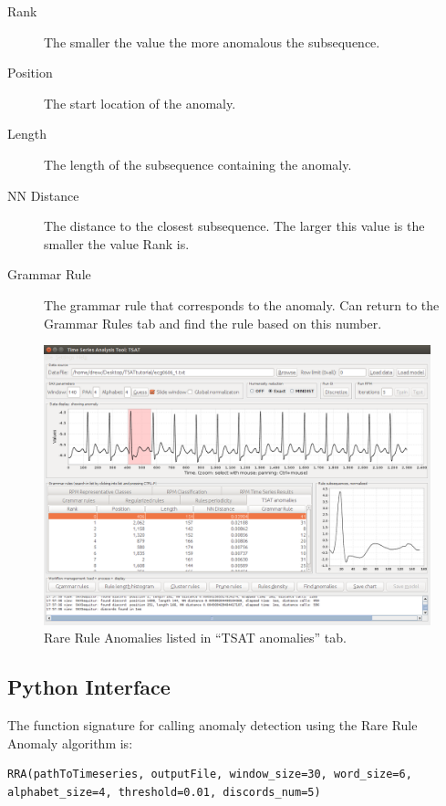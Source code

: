 \documentclass[titlepage, letterpaper, 12pt]{article}
\begin{document}
\begin{description}
	\item[Rank] The smaller the value the more anomalous the subsequence.
	\item[Position] The start location of the anomaly.
	\item[Length] The length of the subsequence containing the anomaly.
	\item[NN Distance] The distance to the closest subsequence.  The larger this value is the smaller the value Rank is.
	\item[Grammar Rule] The grammar rule that corresponds to the anomaly.  Can return to the Grammar Rules tab and find the rule based on this number.
\end{description}

\begin{figure}[H]
	\centering
	\includegraphics[width=\textwidth]{pictures/motifguide/RRAResult}
	\caption{Rare Rule Anomalies listed in ``TSAT anomalies'' tab.}
	\label{fig:rraresult}
\end{figure}

\subsection{Python Interface}
\label{pythonAnomaly}
The function signature for calling anomaly detection using the Rare Rule Anomaly algorithm is:
\begin{lstlisting}
RRA(pathToTimeseries, outputFile, window_size=30, word_size=6, alphabet_size=4, threshold=0.01, discords_num=5)
\end{lstlisting}
\end{document}
